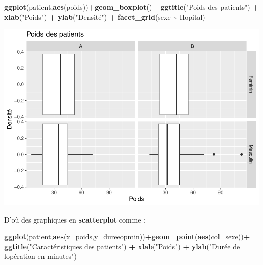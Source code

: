 \documentclass[
]{book}
\newenvironment{Shaded}{\begin{snugshade}}{\end{snugshade}}
\newcommand{\AttributeTok}[1]{\textcolor[rgb]{0.13,0.29,0.53}{#1}}
\newcommand{\FunctionTok}[1]{\textcolor[rgb]{0.13,0.29,0.53}{\textbf{#1}}}
\newcommand{\NormalTok}[1]{#1}
\newcommand{\SpecialCharTok}[1]{\textcolor[rgb]{0.81,0.36,0.00}{\textbf{#1}}}
\newcommand{\StringTok}[1]{\textcolor[rgb]{0.31,0.60,0.02}{#1}}
\begin{document}
\begin{Shaded}
\begin{Highlighting}[]
\FunctionTok{ggplot}\NormalTok{(patient,}\FunctionTok{aes}\NormalTok{(poids))}\SpecialCharTok{+}\FunctionTok{geom\_boxplot}\NormalTok{()}\SpecialCharTok{+}
  \FunctionTok{ggtitle}\NormalTok{(}\StringTok{"Poids des patients"}\NormalTok{) }\SpecialCharTok{+} 
  \FunctionTok{xlab}\NormalTok{(}\StringTok{"Poids"}\NormalTok{) }\SpecialCharTok{+} 
  \FunctionTok{ylab}\NormalTok{(}\StringTok{"Densité"}\NormalTok{) }\SpecialCharTok{+}
  \FunctionTok{facet\_grid}\NormalTok{(sexe }\SpecialCharTok{\textasciitilde{}}\NormalTok{ Hopital)}
\end{Highlighting}
\end{Shaded}

\includegraphics{_main_files/figure-latex/ggplot14-1.pdf}

D'où des graphiques en \textbf{scatterplot} comme :

\begin{Shaded}
\begin{Highlighting}[]
\FunctionTok{ggplot}\NormalTok{(patient,}\FunctionTok{aes}\NormalTok{(}\AttributeTok{x=}\NormalTok{poids,}\AttributeTok{y=}\NormalTok{dureeopmin))}\SpecialCharTok{+}\FunctionTok{geom\_point}\NormalTok{(}\FunctionTok{aes}\NormalTok{(}\AttributeTok{col=}\NormalTok{sexe))}\SpecialCharTok{+}
  \FunctionTok{ggtitle}\NormalTok{(}\StringTok{"Caractéristiques des patients"}\NormalTok{) }\SpecialCharTok{+} 
  \FunctionTok{xlab}\NormalTok{(}\StringTok{"Poids"}\NormalTok{) }\SpecialCharTok{+} 
  \FunctionTok{ylab}\NormalTok{(}\StringTok{"Durée de l\textquotesingle{}opération en minutes"}\NormalTok{) }
\end{Highlighting}
\end{Shaded}
\end{document}
